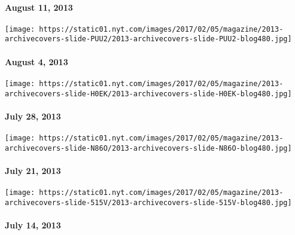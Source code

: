 \hypertarget{august-11-2013}{%
\paragraph{August 11, 2013}\label{august-11-2013}}

\href{http://www.nytimes.com/indexes/2013/08/04/magazine/index.html}{}

\texttt{[image: https://static01.nyt.com/images/2017/02/05/magazine/2013-archivecovers-slide-PUU2/2013-archivecovers-slide-PUU2-blog480.jpg]}

\hypertarget{august-4-2013}{%
\paragraph{August 4, 2013}\label{august-4-2013}}

\href{http://www.nytimes.com/indexes/2013/07/28/magazine/index.html}{}

\texttt{[image: https://static01.nyt.com/images/2017/02/05/magazine/2013-archivecovers-slide-H0EK/2013-archivecovers-slide-H0EK-blog480.jpg]}

\hypertarget{july-28-2013}{%
\paragraph{July 28, 2013}\label{july-28-2013}}

\href{http://www.nytimes.com/indexes/2013/07/21/magazine/index.html}{}

\texttt{[image: https://static01.nyt.com/images/2017/02/05/magazine/2013-archivecovers-slide-N86O/2013-archivecovers-slide-N86O-blog480.jpg]}

\hypertarget{july-21-2013}{%
\paragraph{July 21, 2013}\label{july-21-2013}}

\href{http://www.nytimes.com/indexes/2013/07/14/magazine/index.html}{}

\texttt{[image: https://static01.nyt.com/images/2017/02/05/magazine/2013-archivecovers-slide-515V/2013-archivecovers-slide-515V-blog480.jpg]}

\hypertarget{july-14-2013}{%
\paragraph{July 14, 2013}\label{july-14-2013}}

\href{http://www.nytimes.com/indexes/2013/07/07/magazine/index.html}{}

